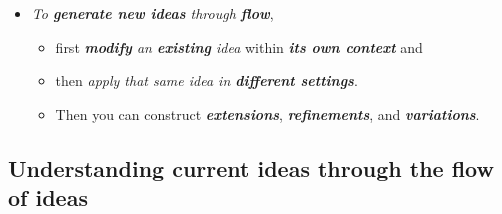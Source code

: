\documentclass[11pt]{article}
\begin{document}
\begin{itemize}
\item \emph{To \textbf{generate new ideas} through \textbf{flow}}, 
\begin{itemize}
\item first \emph{\textbf{modify} an \textbf{existing} idea} within \emph{\textbf{its own context}} and
\item then \emph{apply that same idea in \textbf{different settings}}. 
\item Then you can construct \emph{\textbf{extensions}}, \emph{\textbf{refinements}}, and \emph{\textbf{variations}}.
\end{itemize}
 
\end{itemize}

\subsection{Understanding current ideas through the flow of ideas}
\end{document}
